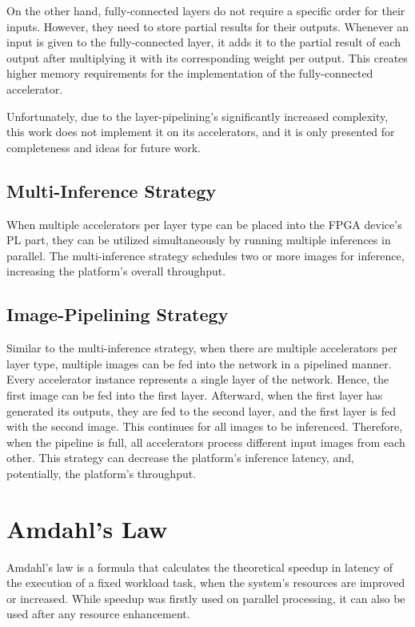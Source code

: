 On the other hand, fully-connected layers do not require a specific order for their inputs. However, they need to store partial results for their outputs. Whenever an input is given to the fully-connected layer, it adds it to the partial result of each output after multiplying it with its corresponding weight per output. This creates higher memory requirements for the implementation of the fully-connected accelerator.

Unfortunately, due to the layer-pipelining's significantly increased complexity, this work does not implement it on its accelerators, and it is only presented for completeness and ideas for future work.

\subsection{Multi-Inference Strategy}
When multiple accelerators per layer type can be placed into the FPGA device's PL part, they can be utilized simultaneously by running multiple inferences in parallel. The multi-inference strategy schedules two or more images for inference, increasing the platform's overall throughput.

\subsection{Image-Pipelining Strategy}
Similar to the multi-inference strategy, when there are multiple accelerators per layer type, multiple images can be fed into the network in a pipelined manner. Every accelerator instance represents a single layer of the network. Hence, the first image can be fed into the first layer. Afterward, when the first layer has generated its outputs, they are fed to the second layer, and the first layer is fed with the second image. This continues for all images to be inferenced. Therefore, when the pipeline is full, all accelerators process different input images from each other. This strategy can decrease the platform's inference latency, and, potentially, the platform's throughput.

\section{Amdahl's Law}
\label{sec:Amdahls-Law}
Amdahl's law \cite{Improvements-in-Multiprocessor-System-Design} is a formula that calculates the theoretical speedup in latency of the execution of a fixed workload task, when the system's resources are improved or increased. While speedup was firstly used on parallel processing, it can also be used after any resource enhancement.

